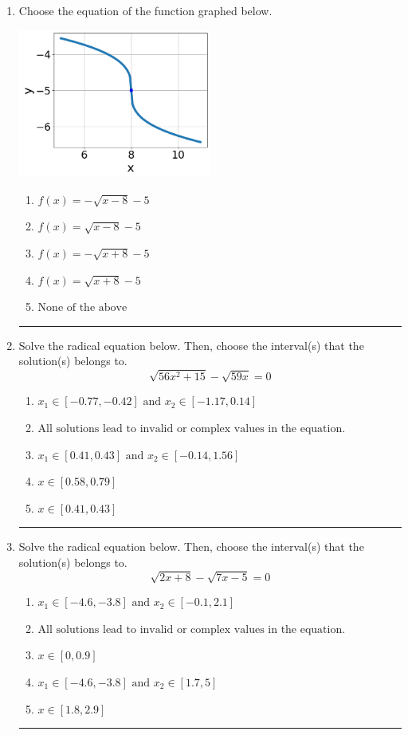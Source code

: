 \documentclass[14pt]{extbook}
\newcommand{\litem}[1]{\item#1\hspace*{-1cm}\rule{\textwidth}{0.4pt}}
\begin{document}
\begin{enumerate}
{\begin{enumerate}[label=\Alph*.]
\end{enumerate} }
\litem{
Choose the equation of the function graphed below.
\begin{center}
    \includegraphics[width=0.5\textwidth]{../Figures/radicalGraphToEquationA.png}
\end{center}
\begin{enumerate}[label=\Alph*.]
\item \( f(x) = - \sqrt{x - 8} - 5 \)
\item \( f(x) = \sqrt{x - 8} - 5 \)
\item \( f(x) = - \sqrt{x + 8} - 5 \)
\item \( f(x) = \sqrt{x + 8} - 5 \)
\item \( \text{None of the above} \)

\end{enumerate} }
\litem{
Solve the radical equation below. Then, choose the interval(s) that the solution(s) belongs to.\[ \sqrt{56 x^2 + 15} - \sqrt{59 x} = 0 \]\begin{enumerate}[label=\Alph*.]
\item \( x_1 \in [-0.77, -0.42] \text{ and } x_2 \in [-1.17,0.14] \)
\item \( \text{All solutions lead to invalid or complex values in the equation.} \)
\item \( x_1 \in [0.41, 0.43] \text{ and } x_2 \in [-0.14,1.56] \)
\item \( x \in [0.58,0.79] \)
\item \( x \in [0.41,0.43] \)

\end{enumerate} }
\litem{
Solve the radical equation below. Then, choose the interval(s) that the solution(s) belongs to.\[ \sqrt{2 x + 8} - \sqrt{7 x - 5} = 0 \]\begin{enumerate}[label=\Alph*.]
\item \( x_1 \in [-4.6, -3.8] \text{ and } x_2 \in [-0.1,2.1] \)
\item \( \text{All solutions lead to invalid or complex values in the equation.} \)
\item \( x \in [0,0.9] \)
\item \( x_1 \in [-4.6, -3.8] \text{ and } x_2 \in [1.7,5] \)
\item \( x \in [1.8,2.9] \)


\end{enumerate}}
\end{enumerate}
\end{document}
